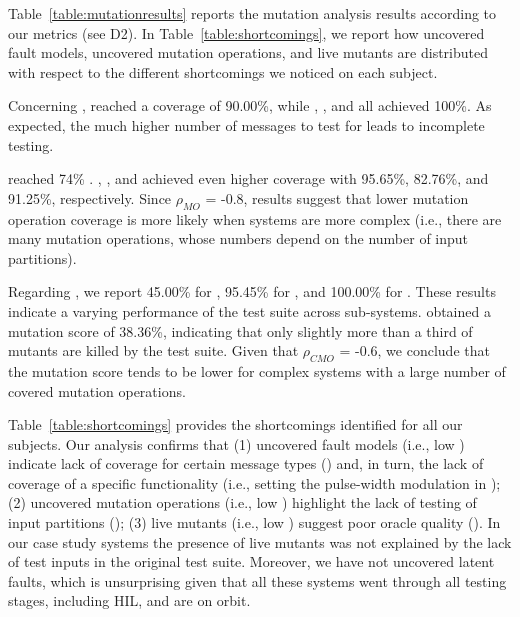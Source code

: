 



Table~\ref{table:mutationresults} reports the mutation analysis results according to our metrics (see D2).
In Table~\ref{table:shortcomings}, we report how uncovered fault models, uncovered mutation operations, and live mutants are distributed with respect to the different shortcomings we noticed on each subject.

Concerning , \ADCS reached a coverage of 90.00\%, while \GPS, \PDHU, and \PARAM all achieved 100\%.  
As expected, the much higher number of messages to test for \ADCS leads to incomplete testing. 

\ADCS reached 74\% . \GPS, \PDHU, and \PARAM  achieved even higher coverage with 95.65\%, 82.76\%, and 91.25\%,  respectively. Since 
$\rho_{MO}$ = -0.8, results suggest that lower mutation operation coverage is more likely when systems are more complex (i.e., there are many mutation operations, whose numbers depend on the number of input partitions). 

Regarding , we report 45.00\% for \ADCS,  95.45\% for \GPS,  and 100.00\% for \PDHU. These results indicate a varying performance of the \SVF test suite across sub-systems.
\PARAM obtained a mutation score of 38.36\%, indicating that only slightly more than a third of mutants are killed by the test suite.
Given that 
$\rho_{CMO}$ = -0.6, 
we conclude that the mutation score tends to be lower for complex systems with a large number of covered mutation operations.

Table~\ref{table:shortcomings} provides the shortcomings identified for all our subjects. 
Our analysis confirms that (1) uncovered fault models (i.e., low ) indicate lack of coverage for certain message types () and, in turn, the lack of coverage of a specific functionality (i.e., setting the pulse-width modulation in \ADCS); (2) uncovered mutation operations (i.e., low ) highlight the lack of testing of input partitions (); (3) live mutants (i.e., low ) suggest poor oracle quality (). In our case study systems the presence of live mutants was not explained by the lack of test inputs in the original test suite. Moreover, we have not uncovered latent faults, which is unsurprising given that all these systems went through all testing stages, including HIL, and are on orbit. 

